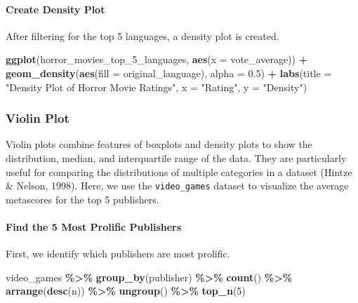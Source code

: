 \documentclass[
]{book}
\newenvironment{Shaded}{\begin{snugshade}}{\end{snugshade}}
\newcommand{\AttributeTok}[1]{\textcolor[rgb]{0.13,0.29,0.53}{#1}}
\newcommand{\DecValTok}[1]{\textcolor[rgb]{0.00,0.00,0.81}{#1}}
\newcommand{\FloatTok}[1]{\textcolor[rgb]{0.00,0.00,0.81}{#1}}
\newcommand{\FunctionTok}[1]{\textcolor[rgb]{0.13,0.29,0.53}{\textbf{#1}}}
\newcommand{\NormalTok}[1]{#1}
\newcommand{\SpecialCharTok}[1]{\textcolor[rgb]{0.81,0.36,0.00}{\textbf{#1}}}
\newcommand{\StringTok}[1]{\textcolor[rgb]{0.31,0.60,0.02}{#1}}
\begin{document}
\paragraph*{Create Density Plot}\label{create-density-plot}

After filtering for the top 5 languages, a density plot is created.

\begin{Shaded}
\begin{Highlighting}[]
\FunctionTok{ggplot}\NormalTok{(horror\_movies\_top\_5\_languages, }\FunctionTok{aes}\NormalTok{(}\AttributeTok{x =}\NormalTok{ vote\_average)) }\SpecialCharTok{+}
  \FunctionTok{geom\_density}\NormalTok{(}\FunctionTok{aes}\NormalTok{(}\AttributeTok{fill =}\NormalTok{ original\_language), }\AttributeTok{alpha =} \FloatTok{0.5}\NormalTok{) }\SpecialCharTok{+}
  \FunctionTok{labs}\NormalTok{(}\AttributeTok{title =} \StringTok{"Density Plot of Horror Movie Ratings"}\NormalTok{,}
       \AttributeTok{x =} \StringTok{"Rating"}\NormalTok{,}
       \AttributeTok{y =} \StringTok{"Density"}\NormalTok{)}
\end{Highlighting}
\end{Shaded}

\subsubsection*{Violin Plot}\label{violin-plot}

Violin plots combine features of boxplots and density plots to show the distribution, median, and interquartile range of the data. They are particularly useful for comparing the distributions of multiple categories in a dataset (Hintze \& Nelson, 1998). Here, we use the \texttt{video\_games} dataset to visualize the average metascores for the top 5 publishers.

\paragraph*{Find the 5 Most Prolific Publishers}\label{find-the-5-most-prolific-publishers}

First, we identify which publishers are most prolific.

\begin{Shaded}
\begin{Highlighting}[]
\NormalTok{video\_games }\SpecialCharTok{\%\textgreater{}\%}
  \FunctionTok{group\_by}\NormalTok{(publisher) }\SpecialCharTok{\%\textgreater{}\%}
  \FunctionTok{count}\NormalTok{() }\SpecialCharTok{\%\textgreater{}\%}
  \FunctionTok{arrange}\NormalTok{(}\FunctionTok{desc}\NormalTok{(n)) }\SpecialCharTok{\%\textgreater{}\%}
  \FunctionTok{ungroup}\NormalTok{() }\SpecialCharTok{\%\textgreater{}\%}
  \FunctionTok{top\_n}\NormalTok{(}\DecValTok{5}\NormalTok{)}
\end{Highlighting}
\end{Shaded}
\end{document}
